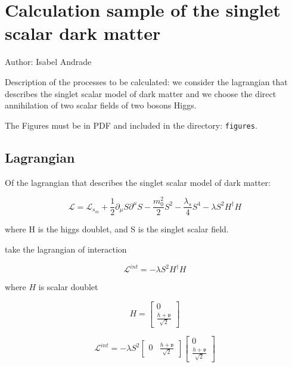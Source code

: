 \chapter{Calculation sample of the singlet scalar dark matter}

Author: Isabel Andrade

Description of the processes to be calculated: we consider the lagrangian that describes the singlet scalar model of dark matter and we choose the direct annihilation of two scalar fields of two bosons Higgs.

The Figures must be in PDF and included in the directory: \verb|figures|.

\section{Lagrangian}

Of the lagrangian that describes the singlet scalar model of dark matter:

\begin{equation}
\mathcal{L}=\mathcal{L}_s_m + \frac{1}{2} \partial_\mu S\partial^\mu S -\frac{m_0 ^2}{2} S^2 - \frac{\lambda_s}{4} S^4 - \lambda S^2H^\dagger H
\end{equation}

where H is the higgs doublet, and S is the singlet scalar field.

take the lagrangian of interaction

\begin{equation}
\mathcal{L}^{int} = - \lambda S^2 H^\dagger H
\end{equation}

where $H$ is scalar doublet

\begin{equation}
H=\begin{bmatrix}{0}\\{\frac{h+\mathfrak{v}}{\sqrt{2}}}\end{bmatrix}
\end{equation}

\begin{equation}
\mathcal{L}^{int}= - \lambda S^2 \begin{bmatrix}{0}&{\frac{h+\mathfrak{v}}{\sqrt{2}}}\end{bmatrix} \begin{bmatrix}{0}\\{\frac{h+\mathfrak{v}}{\sqrt{2}}}\end{bmatrix}
\end{equation}

